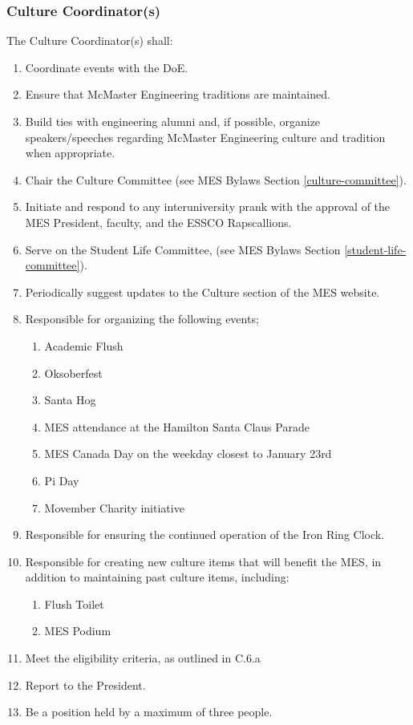 \subsubsection{Culture Coordinator(s)}
\label{culture-coordinators}
The Culture Coordinator(s) shall:

\begin{enumerate}
 \item
  Coordinate events with the DoE.
 \item
  Ensure that McMaster Engineering traditions are maintained.
 \item
  Build ties with engineering alumni and, if possible, organize speakers/speeches regarding McMaster Engineering culture and tradition when appropriate.
 \item
  Chair the Culture Committee (see MES Bylaws Section \ref{culture-committee}).
 \item
  Initiate and respond to any interuniversity prank with the approval of the MES President, faculty, and the ESSCO Rapscallions.
 \item
  Serve on the Student Life Committee, (see MES Bylaws Section \ref{student-life-committee}).
 \item
  Periodically suggest updates to the Culture section of the MES website.
 \item
  Responsible for organizing the following events;

  \begin{enumerate}
   \item
    Academic Flush
   \item
    Oksoberfest
   \item
    Santa Hog
   \item
    MES attendance at the Hamilton Santa Claus Parade
   \item
    MES Canada Day on the weekday closest to January 23rd
   \item
    Pi Day
   \item
    Movember Charity initiative
  \end{enumerate}
 \item
  Responsible for ensuring the continued operation of the Iron Ring Clock.
 \item
  Responsible for creating new culture items that will benefit the MES, in addition to maintaining past culture items, including:

  \begin{enumerate}
   \item
    Flush Toilet
   \item
    MES Podium
  \end{enumerate}
 \item
  Meet the eligibility criteria, as outlined in C.6.a %
 \item
  Report to the President.
 \item
  Be a position held by a maximum of three people.

\end{enumerate}